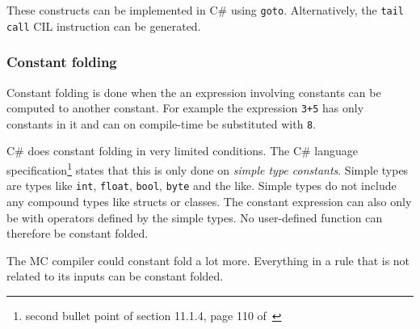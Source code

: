 These constructs can be implemented in C# using \verb|goto|.
Alternatively, the \verb|tail call| CIL instruction can be generated.

\subsubsection{Constant folding}
Constant folding is done when the an expression involving constants can be computed to another constant.
For example the expression \verb|3+5| has only constants in it and can on compile-time be substituted with \verb|8|. 

C\# does constant folding in very limited conditions.
The C\# language specification\footnote{second bullet point of section 11.1.4, page 110 of~\cite{csharp_spec}} states that this is only done on \textit{simple type constants}.
Simple types are types like \verb|int|, \verb|float|, \verb|bool|, \verb|byte| and the like.
Simple types do not include any compound types like structs or classes.
The constant expression can also only be with operators defined by the simple types.
No user-defined function can therefore be constant folded.

The MC compiler could constant fold a lot more.
Everything in a rule that is not related to its inputs can be constant folded.

